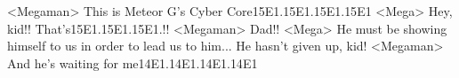 <Megaman> This is Meteor G's Cyber Core{15}{E1}.{15}{E1}.{15}{E1}.{15}{E1} 
<Mega> Hey, kid!! That's{15}{E1}.{15}{E1}.{15}{E1}.!! 
<Megaman> Dad!! 
<Mega> He must be showing himself to us in order to lead us to him... 
He hasn't given up, kid! 
<Megaman> And he's waiting for me{14}{E1}.{14}{E1}.{14}{E1}.{14}{E1} 

